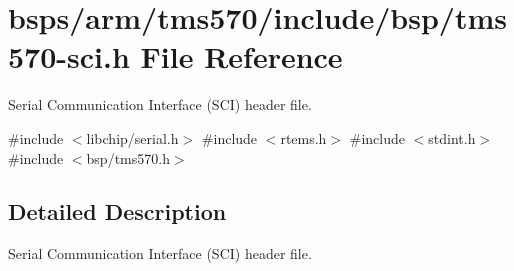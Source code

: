 \hypertarget{tms570-sci_8h}{}\section{bsps/arm/tms570/include/bsp/tms570-\/sci.h File Reference}
\label{tms570-sci_8h}


Serial Communication Interface (S\+CI) header file.  


{\ttfamily \#include $<$libchip/serial.\+h$>$}\newline
{\ttfamily \#include $<$rtems.\+h$>$}\newline
{\ttfamily \#include $<$stdint.\+h$>$}\newline
{\ttfamily \#include $<$bsp/tms570.\+h$>$}\newline


\subsection{Detailed Description}
Serial Communication Interface (S\+CI) header file. 

